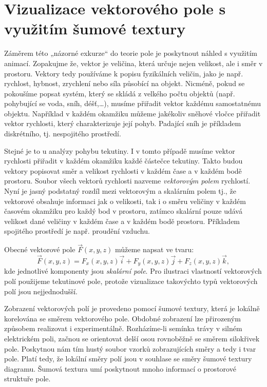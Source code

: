   \section{Vizualizace vektorového pole s využitím šumové textury}
    Záměrem této „názorné exkurze“ do teorie pole je poskytnout náhled s využitím animací. 
    Zopakujme že, vektor je veličina, která určuje nejen velikost, ale i směr v prostoru. Vektory 
    tedy používáme k popisu fyzikálních veličin, jako je např. rychlost, hybnost, zrychlení nebo 
    síla působící na objekt. Nicméně, pokud se pokoušíme popsat systém, který se skládá z velkého 
    počtu objektů (např. pohybující se voda, sníh, déšť,…), musíme přiřadit vektor každému 
    samostatnému objektu. Například v každém okamžiku můžeme jakékoliv sněhové vločce přiřadit 
    vektor rychlosti, který charakterizuje její pohyb. Padající sníh je příkladem diskrétního, tj. 
    nespojitého prostředí.    
    
    Stejné je to u analýzy pohybu tekutiny. I v tomto případě musíme vektor rychlosti přiřadit v 
    každém okamžiku každé částečce tekutiny. Takto budou vektory popisovat směr a velikost 
    rychlosti v každém čase a v každém bodě prostoru. Soubor všech vektorů rychlosti nazveme 
    \emph{vektorovým polem} rychlostí. Nyní je jasný podstatný rozdíl mezi vektorovým a skalárním 
    polem tj., že vektorové obsahuje informaci jak o velikosti, tak i o směru veličiny v každém 
    časovém okamžiku pro každý bod v prostoru, zatímco skalární pouze udává velikost dané veličiny 
    v každém čase a v každém bodě prostoru. Příkladem spojitého prostředí je např. proudění vzduchu.
    
    Obecné vektorové pole \(\vec{F}(x, y, z)\) můžeme napsat ve tvaru:
    \begin{equation}
     \vec{F}(x,y,z) = F_x(x,y,z)\vec{i} + F_y(x,y,z)\vec{j} + F_z(x,y,z)\vec{k},
    \end{equation} 
    kde jednotlivé komponenty jsou \emph{skalární pole}. Pro ilustraci vlastností vektorových polí 
    použijeme tekutinové pole, protože vizualizace takovýchto typů vektorových polí jsou 
    nejjednodušší.  
    
    Zobrazení vektorových polí je provedeno pomocí šumové textury, která je lokálně korelována se 
    směrem vektorového pole. Obdobné zobrazení lze přirozeným způsobem realizovat i experimentálně. 
    Rozházíme-li semínka trávy v silném elektrickém poli, začnou se orientovat delší osou 
    rovnoběžně se směrem silokřivek pole. Poskytnou nám tím hustý soubor vzorků zobrazujících směry 
    a tedy i tvar pole. Platí tedy, že lokální směry polí jsou v souhlase se směry šumové textury 
    diagramu. Šumová textura umí poskytnout mnoho informací o prostorové struktuře pole.

